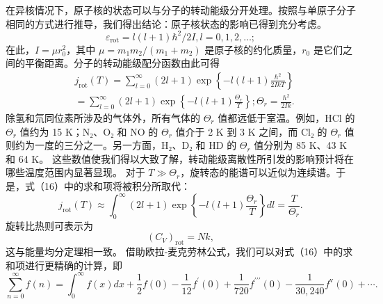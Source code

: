 在异核情况下，原子核的状态可以与分子的转动能级分开处理。按照与单原子分子相同的方式进行推导，我们得出结论：原子核状态的影响已得到充分考虑。
\begin{equation}\tag{6.5.19}\label{eq:6.5.19}
\varepsilon _ { \mathrm { r o t } } = l ( l + 1 ) \hbar ^{2} / 2 I ,  l = 0 , 1 , 2 , \ldots ;
\end{equation}
在此，\(I = \mu r_{0}^{2}\)，其中 \(\mu = m_{1}m_{2}/(m_{1}+m_{2})\) 是原子核的约化质量，\(r_{0}\) 是它们之间的平衡距离。分子的转动能级配分函数由此可得
\begin{equation}\tag{6.5.20}\label{eq:6.5.20}
\begin{array}{rl} & { j _ { \mathrm { r o t } } ( T ) = \displaystyle \sum _ { l = 0 } ^{\infty} ( 2 l + 1 ) \exp \left\{ - l ( l + 1 ) \frac { \hbar ^{2} } { 2 I k T } \right\} } \\& {  = \displaystyle \sum _ { l = 0 } ^{\infty} ( 2 l + 1 ) \exp \left\{ - l ( l + 1 ) \frac { \Theta _ { r } } { T } \right\} ;  \Theta _ { r } = \frac { \hbar ^{2} } { 2 I k } . } \end{array}
\end{equation}
除氢和氘同位素所涉及的气体外，所有气体的 \(\Theta_{r}\) 值都远低于室温。例如，HCl 的 \(\Theta_{r}\) 值约为 15 K；N₂、O₂ 和 NO 的 \(\Theta_{r}\) 值介于 2 K 到 3 K 之间，而 Cl₂ 的 \(\Theta_{r}\) 值则约为一度的三分之一。另一方面，H₂、D₂ 和 HD 的 \(\Theta_{r}\) 值分别为 85 K、43 K 和 64 K。
这些数值使我们得以大致了解，转动能级离散性所引发的影响预计将在哪些温度范围内显著显现。
对于 \(T \gg \Theta_{r}\)，旋转态的能谱可以近似为连续谱。于是，式（16）中的求和项将被积分所取代：
\begin{equation}\tag{6.5.21}\label{eq:6.5.21}
j _ { \mathrm { r o t } } ( T ) \approx \int _ { 0 } ^{\infty} ( 2 l + 1 ) \exp \left\{ - l ( l + 1 ) \frac { \Theta _ { r } } { T } \right\} d l = \frac { T } { \Theta _ { r } } .
\end{equation}
旋转比热则可表示为
\begin{equation}\tag{6.5.22}\label{eq:6.5.22}
( C _ { V } ) _ { \mathrm { r o t } } = N k ,
\end{equation}
这与能量均分定理相一致。
借助欧拉-麦克劳林公式，我们可以对式（16）中的求和项进行更精确的计算，即
\begin{equation}\tag{6.5.23}\label{eq:6.5.23}
\sum _ { n = 0 } ^{\infty} f ( n ) = \int _ { 0 } ^{\infty} f ( x ) d x + { \frac { 1 } { 2 } } f ( 0 ) - { \frac { 1 } { 12 } } f ^{\prime} ( 0 ) + { \frac { 1 } { 72 0 } } f ^{\prime \prime \prime} ( 0 ) - { \frac { 1 } { 30 , 24 0 } } f ^{\mathrm { v} } ( 0 ) + \cdots .
\end{equation}
